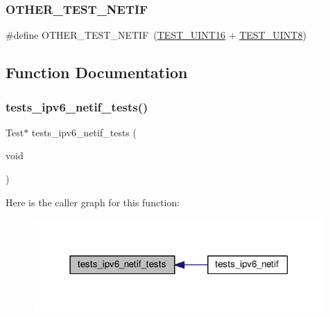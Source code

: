 \subsubsection{\texorpdfstring{O\+T\+H\+E\+R\+\_\+\+T\+E\+S\+T\+\_\+\+N\+E\+T\+IF}{OTHER\_TEST\_NETIF}}
{\footnotesize\ttfamily \#define O\+T\+H\+E\+R\+\_\+\+T\+E\+S\+T\+\_\+\+N\+E\+T\+IF~(\hyperlink{unittests-constants_8h_ada84310dd4f52d94096d5baed5eb75e1}{T\+E\+S\+T\+\_\+\+U\+I\+N\+T16} + \hyperlink{unittests-constants_8h_a9a493e3e4fe69d0b8c338869ebcadbc4}{T\+E\+S\+T\+\_\+\+U\+I\+N\+T8})}



\subsection{Function Documentation}
\mbox{\label{tests-ipv6__netif_8c_a8e371cf04b9c4b0aa11e072256b46fe5}} 
\subsubsection{\texorpdfstring{tests\+\_\+ipv6\+\_\+netif\+\_\+tests()}{tests\_ipv6\_netif\_tests()}}
{\footnotesize\ttfamily Test$\ast$ tests\+\_\+ipv6\+\_\+netif\+\_\+tests (\begin{DoxyParamCaption}\item[{void}]{ }\end{DoxyParamCaption})}

Here is the caller graph for this function\+:
\nopagebreak
\begin{figure}[H]
\begin{center}
\leavevmode
\includegraphics[width=315pt]{tests-ipv6__netif_8c_a8e371cf04b9c4b0aa11e072256b46fe5_icgraph}
\end{center}
\end{figure}
